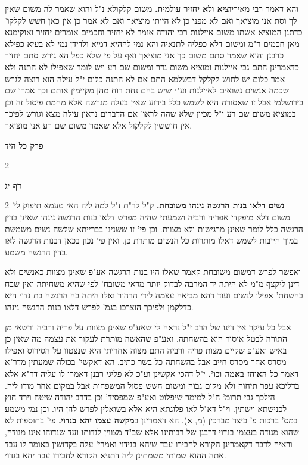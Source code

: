 \documentclass[12pt, openany]{book}
\newcommand{\sethebfont}{
\fontsize{10.5pt}{21.0pt} \selectfont
}
\newcommand{\twocol}[1]{
	{\sethebfont \begin{multicols}{2}
			#1
	\end{multicols}}	
}
\newcommand{\chapname}{}
\newcommand{\sectname}{}
\newcommand{\newchap}[1]{
	\addcontentsline{toc}{chapter}{#1}
	\renewcommand{\chapname}{#1}
		\begin{center}
			\textbf{%
\fontsize{16pt}{16pt}\selectfont
				#1}
		\end{center}
}
\newcommand{\newsection}[1]{
	\renewcommand{\sectname}{#1}	
	\vspace{-\baselineskip}
	\begin{center}
		\textbf{%
\fontsize{16pt}{16pt}\selectfont
			#1}
	\end{center}
	\vspace{-\baselineskip}
	\nopagebreak
}
\begin{document}
{{ והא דאמר רבי מאיר\textbf{יוציא ולא יחזיר עולמית.} משום קלקולא נ"ל והוא שאמר לה משום שאין לך וסת אני מוציאך ואם לא מפני כן לא הייתי מוציאך ואם לא אמר כן אין כאן חשש לקלקו' כדתנן המוציא אשתו משום איילנות רבי יהודה אומר לא יחזיר וחכמים אומרים יחזיר ואוקימנא מאן חכמים ר"מ ומשום דלא כפליה לתנאיה והא נמי לההיא דמיא ולדידן נמי לא בעיא כפילא כרבנן והוא שאמר סתם משום כך אני מוציאך ואף על פי שלא כפל הא גירש סתם יחזיר כדאמרינן התם גבי איילנות ומוציא משום נדר ומשום שם רע ויש לומר שאפילו לא התנה ולא אמר כלום יש לחוש לקלקל דבשלמא התם אם לא התנה כלום י"ל עילה הוא רוצה לגרש שכמה אנשים נשואים לאיילנות וע"י שיש בהם נחת רוח מהן מקיימין אותם וכך אמרו שם בירושלמי אבל זו שאסורה היא לשמש כלל בידוע שאין בעלה מגרשה אלא מחמת פיסול זה וכן במוציא משום שם רע י"ל מכיון שלא שהה לראו' אם הדברים נראין עילה מצא וגורש לפיכך אין חוששין לקלקול אלא שאמר משום שם רע אני מוציאך. }

\newchap{פרק  כל היד}
\twocol{\clearpage}

\newsection{דף יג}
\twocol{\textbf{נשים דלאו בנות הרגשה נינהו משובחת.} ק"ל לר"ת ז"ל למה ליה האי טעמא תיפוק לי' משום דלא מיפקדי אפריה ורביה ושמעתי שהיה מפרש דלאו בנות הרגשה נינהו שאינן בדין הרגשה כלל לומר שאינן מרגישות ולא מצוות. וכן פי' זו ששנינו בברייתא שלשה נשים משמשת במוך חייבות לשמש דאלו מותרות כל הנשים מותרת כן. ואין פי' נכון בכאן דבנות הרגשה לאו בדין הרגשה משמע.\par ואפשר לפרש דמשום משובחת קאמר שאלו היו בנות הרגשה אע"פ שאינן מצוות כאנשים ולא דינן ליקצף מ"מ לא היתה יד המרבה לבדוק יותר מדאי משובח' לפי שהיא משחיתה ואין שבח בהשחת' אפילו לנשים ועוד דהא מביאה עצמה לידי הרהור ואלו היתה בה הרגשה בת נדוי היא כדלקמן ולפיכך הוצרכו בגמ' לפרש דלאו בנות הרגשה נינהו.\par אבל כל עיקר אין דינו של הרב ז"ל נראה לי שאע"פ שאינן מצוות על פריה ורביה ורשאי מן התורה לבטל איסור הוא בהשחתה. ואע"פ שהאשה מותרת לעקור את עצמה מה שאין כן באיש ואע"פ שקיים מצות פריה ורביה התם מצוה אחריתי היא שנצטוו על הסירוס ואפילו מסרס אחר מסרס חייב אבל בהשחתה כל בשר כתיב. 
הא דאקשי' בכולה שמעתין מדר"א דאמר \textbf{כל האוחז באמה וכו'.} י"ל דהכי אקשינן וע"כ לא פליגי רבנן דאמרו לו עליה דר"א אלא בדליכא עפר תיחוח ולא מקום גבוה ומשום חשש פסול המשפחות אבל במקום אחר מודו ליה. הילכך גבי תרומ' ה"ל למימר שיפלוט ואע"פ שמפסיד' וכן בדרב יהודה שיטה וירד חוץ לכנישתא וישתין. וי"ל דא"ל לאו פלוגתא היא אלא בשואלין לפרש להן היו. וכן נמי משמע במס' ברכות פ' כיצד מברכין (מ, א). 
הא דאמרינן ב\textbf{מקשה עצמו יהא בנדוי.} פי' בתוספות לא שהוא מנודה בעצמו בנדוי דרבנן של רבותינו אלא שב"ד מצווין לנדותו ועד שנדוהו אינו מנודה, וראיה לדבר דקאמרינן הקורא לחבירו עבד שיהא בנידוי ואמרי' עלה בקדושין באומר לו עבד אתה ההוא שמותי משמתינן ליה דתניא הקורא לחבירו עבד יהא בנדוי. 
\clearpage}

}
\end{document}
